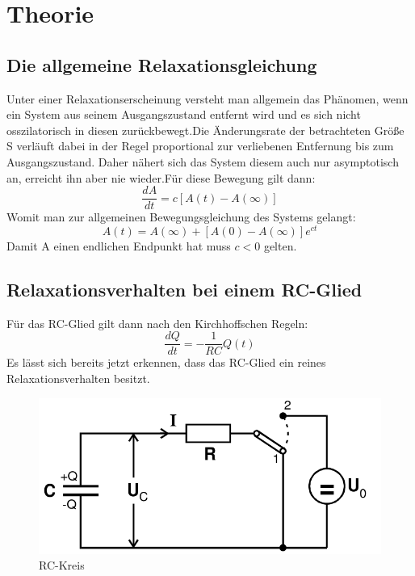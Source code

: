 \section{Theorie}
\label{sec:Theorie}
\subsection{Die allgemeine Relaxationsgleichung}
Unter einer Relaxationserscheinung versteht man allgemein das Phänomen, wenn
 ein System aus seinem Ausgangszustand entfernt wird und es sich nicht osszilatorisch
 in diesen zurückbewegt.Die Änderungsrate der betrachteten Größe S verläuft dabei
 in der Regel proportional zur verliebenen Entfernung bis zum Ausgangszustand. Daher nähert sich
 das System diesem auch nur asymptotisch an, erreicht ihn aber nie wieder.Für diese
 Bewegung gilt dann:
 \begin{equation}
   \frac{dA}{dt} = c[A(t)-A(\infty)]
 \end{equation}
Womit man zur allgemeinen Bewegungsgleichung des Systems gelangt:
\begin{equation}
  A(t) = A(\infty)+[A(0)-A(\infty)]e^{ct}
\end{equation}
Damit A einen endlichen Endpunkt hat muss $ c<0$ gelten.

\subsection{Relaxationsverhalten bei einem RC-Glied}

Für das RC-Glied gilt dann nach den Kirchhoffschen Regeln:
\begin{equation}
  \frac{dQ}{dt} = -\frac{1}{RC}Q(t)
\end{equation}
Es lässt sich bereits jetzt erkennen, dass das RC-Glied ein reines Relaxationsverhalten besitzt.
\begin{figure}[H]
  \centering
  \includegraphics[width=\linewidth-200pt,height=\textheight-200pt,keepaspectratio]{content/RC_Kreis1.png}
  \caption{RC-Kreis}
  \label{fig:RC_Kreis1}
\end{figure}

